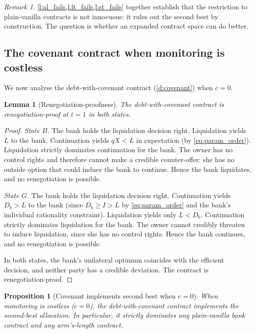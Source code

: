 \documentclass[12pt,a4paper]{article}
\theoremstyle{plain}
\newtheorem{proposition}[theorem]{Proposition}
\newtheorem{lemma}[theorem]{Lemma}
\theoremstyle{definition}
\theoremstyle{remark}
\newtheorem{remark}[theorem]{Remark}
\begin{document}
\begin{remark}
\label{r:plain_vanilla_summary}
\cref{l:al_fails,l:lt_fails,l:st_fails} together establish that the restriction to
plain-vanilla contracts is not innocuous: it rules out the second best by construction.
The question is whether an expanded contract space can do better.
\end{remark}

\subsection{The covenant contract when monitoring is costless}
\label{subsec:covenant_costless}

We now analyse the debt-with-covenant contract (\cref{d:covenant}) when $c = 0$.

\begin{lemma}[Renegotiation-proofness]
\label{l:renegotiation_proof}
The debt-with-covenant contract is renegotiation-proof at $t=1$ in both states.
\end{lemma}

\begin{proof}
\emph{State $B$.} The bank holds the liquidation decision right. Liquidation yields
$L$ to the bank. Continuation yields $qX < L$ in expectation (by \cref{eq:param_order}).
Liquidation strictly dominates continuation for the bank. The owner has no control
rights and therefore cannot make a credible counter-offer: she has no outside option
that could induce the bank to continue. Hence the bank liquidates, and no
renegotiation is possible.

\emph{State $G$.} The bank holds the liquidation decision right. Continuation yields
$D_b > L$ to the bank (since $D_b \geq I > L$ by \cref{eq:param_order} and the
bank's individual rationality constraint). Liquidation yields only $L < D_b$.
Continuation strictly dominates liquidation for the bank. The owner cannot credibly
threaten to induce liquidation, since she has no control rights. Hence the bank
continues, and no renegotiation is possible.

In both states, the bank's unilateral optimum coincides with the efficient decision,
and neither party has a credible deviation. The contract is renegotiation-proof.
\end{proof}

\begin{proposition}[Covenant implements second best when $c=0$]
\label{p:covenant_implements}
When monitoring is costless ($c = 0$), the debt-with-covenant contract implements
the second-best allocation. In particular, it strictly dominates any plain-vanilla
bank contract and any arm's-length contract.
\end{proposition}
\end{document}
